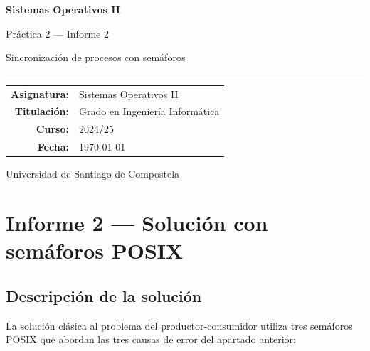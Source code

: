 \documentclass[a4paper, 12pt]{article}
\begin{document}
\begin{titlepage}
  \centering
  \vspace*{3cm}
  {\Huge\bfseries\color{azul} Sistemas Operativos II\par}
  \vspace{0.6cm}
  {\LARGE Práctica 2 --- Informe 2\par}
  \vspace{0.4cm}
  {\large\color{gray} Sincronización de procesos con semáforos\par}
  \vspace{0.5cm}
  \textcolor{azul}{\rule{0.7\linewidth}{1.2pt}}
  \vspace{2cm}

  \begin{tabular}{rl}
    \textbf{Asignatura:} & Sistemas Operativos II \\[4pt]
    \textbf{Titulación:} & Grado en Ingeniería Informática \\[4pt]
    \textbf{Curso:}      & 2024/25 \\[4pt]
    \textbf{Fecha:}      & \today \\
  \end{tabular}

  \vfill
  {\small Universidad de Santiago de Compostela}
\end{titlepage}

\tableofcontents
\newpage

\setcounter{section}{1}

\section{Informe 2 --- Solución con semáforos POSIX}

\subsection{Descripción de la solución}

La solución clásica al problema del productor-consumidor utiliza tres
semáforos POSIX que abordan las tres causas de error del apartado anterior:
\end{document}
